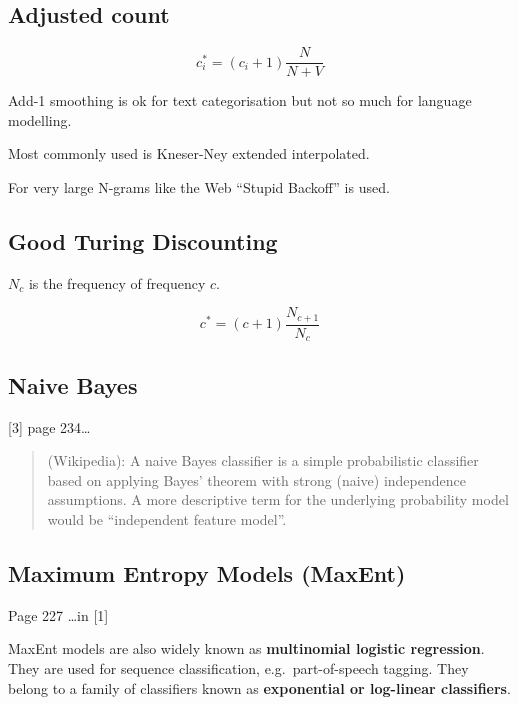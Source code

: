 \subsection*{Adjusted count}

\begin{equation}
  c_i^* = (c_i+1)\frac{N}{N+V}
  \label{eq:ci}
\end{equation}

Add-1 smoothing is ok for text categorisation but not so much for language modelling.

Most commonly used is Kneser-Ney extended interpolated.

For very large N-grams like the Web “Stupid Backoff” is used.


\subsection*{Good Turing Discounting}

$N_c$ is the frequency of frequency $c$.

\begin{equation}
  c^* = (c+1)\frac{N_{c+1}}{N_c}
  \label{eq:cstar}
\end{equation}


\subsection*{Naive Bayes}

[3] page 234…

\begin{quote}
  (Wikipedia): A naive Bayes classifier is a simple probabilistic classifier based on applying Bayes' theorem with strong (naive) independence assumptions. A more descriptive term for the underlying probability model would be ``independent feature model''.
\end{quote}


\subsection*{Maximum Entropy Models (MaxEnt)}

Page 227 \ldots in [1]

MaxEnt models are also widely known as \textbf{multinomial logistic regression}. They are used for sequence classification, e.g.\ part-of-speech tagging. They belong to a family of classifiers known as \textbf{exponential or log-linear classifiers}.

